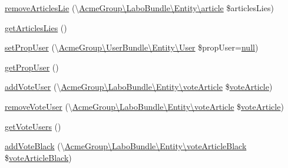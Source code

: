 \begin{DoxyCompactItemize}
\item 
\hyperlink{class_acme_group_1_1_labo_bundle_1_1_entity_1_1article_adc5a1ef166cf22a02a286801fb95bc2c}{remove\+Articles\+Lie} (\textbackslash{}\hyperlink{class_acme_group_1_1_labo_bundle_1_1_entity_1_1article}{Acme\+Group\textbackslash{}\+Labo\+Bundle\textbackslash{}\+Entity\textbackslash{}article} \$articles\+Lies)
\item 
\hyperlink{class_acme_group_1_1_labo_bundle_1_1_entity_1_1article_a2b4de96bf2c9c1120bcabe61412bad66}{get\+Articles\+Lies} ()
\item 
\hyperlink{class_acme_group_1_1_labo_bundle_1_1_entity_1_1article_a929cd5b6469a788a8ead1ecc744c12cd}{set\+Prop\+User} (\textbackslash{}\hyperlink{class_acme_group_1_1_user_bundle_1_1_entity_1_1_user}{Acme\+Group\textbackslash{}\+User\+Bundle\textbackslash{}\+Entity\textbackslash{}\+User} \$prop\+User=\hyperlink{validate_8js_afb8e110345c45e74478894341ab6b28e}{null})
\item 
\hyperlink{class_acme_group_1_1_labo_bundle_1_1_entity_1_1article_a90bf1be4b2d83ea1d954e5d778edd98d}{get\+Prop\+User} ()
\item 
\hyperlink{class_acme_group_1_1_labo_bundle_1_1_entity_1_1article_a088958d9e0366c8e9e93300ed1a38537}{add\+Vote\+User} (\textbackslash{}\hyperlink{class_acme_group_1_1_labo_bundle_1_1_entity_1_1vote_article}{Acme\+Group\textbackslash{}\+Labo\+Bundle\textbackslash{}\+Entity\textbackslash{}vote\+Article} \$\hyperlink{class_acme_group_1_1_labo_bundle_1_1_entity_1_1vote_article}{vote\+Article})
\item 
\hyperlink{class_acme_group_1_1_labo_bundle_1_1_entity_1_1article_a93c83bc9a14e95065fd9a30df56db6dc}{remove\+Vote\+User} (\textbackslash{}\hyperlink{class_acme_group_1_1_labo_bundle_1_1_entity_1_1vote_article}{Acme\+Group\textbackslash{}\+Labo\+Bundle\textbackslash{}\+Entity\textbackslash{}vote\+Article} \$\hyperlink{class_acme_group_1_1_labo_bundle_1_1_entity_1_1vote_article}{vote\+Article})
\item 
\hyperlink{class_acme_group_1_1_labo_bundle_1_1_entity_1_1article_ace40a28440e8db80441adec93e2350c3}{get\+Vote\+Users} ()
\item 
\hyperlink{class_acme_group_1_1_labo_bundle_1_1_entity_1_1article_a282f065ac0124996ca514563c624a26c}{add\+Vote\+Black} (\textbackslash{}\hyperlink{class_acme_group_1_1_labo_bundle_1_1_entity_1_1vote_article_black}{Acme\+Group\textbackslash{}\+Labo\+Bundle\textbackslash{}\+Entity\textbackslash{}vote\+Article\+Black} \$\hyperlink{class_acme_group_1_1_labo_bundle_1_1_entity_1_1vote_article_black}{vote\+Article\+Black})

\end{DoxyCompactItemize}
